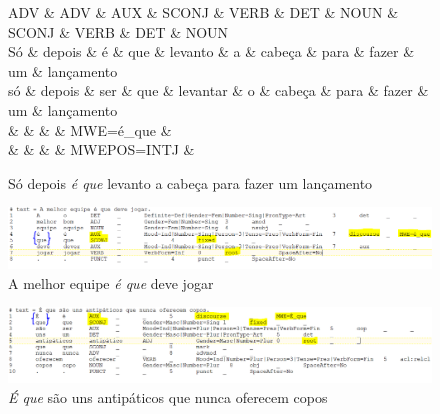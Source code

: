 \documentclass[output=paper,colorlinks,citecolor=brown]{langscibook}
\begin{document}
\begin{figure}[htbp]
			\centering
			\vspace{.8cm}
			\begin{dependency}
				\begin{deptext}
					ADV \& ADV \& AUX \& SCONJ \& VERB \& DET \& NOUN \& SCONJ \& VERB \& DET \& NOUN \\
					Só \& depois \& é \& que \& levanto \& a \& cabeça \& para \& fazer \& um \& lançamento \\
					só \& depois \& ser \& que \& levantar \& o \& cabeça \& para \& fazer \& um \& lançamento \\
					\& \& \& \& MWE=é\_que \& \\
					\& \& \& \& MWEPOS=INTJ \& \\
				\end{deptext}
				
			\end{dependency}
			\caption{Só depois \emph{é que} levanto a cabeça para fazer um lançamento}
			\label{dep:equeMWE1}
		\end{figure}

		\begin{figure}
    	\centering
    	\includegraphics[width=\textwidth,height=\textheight,keepaspectratio]{imagesDrive/image16.png}
    	\caption{A melhor equipe \emph{é que} deve jogar}
    	\label{fig:equeMWE2}
    	\end{figure}{}

	\begin{figure}
    	\centering
    	\includegraphics[width=\textwidth,height=\textheight,keepaspectratio]{imagesDrive/image71.PNG}
    	\caption{\emph{É que} são uns antipáticos que nunca oferecem copos}
    	\label{fig:equeMWE3}
    	\end{figure}{}
\end{document}
